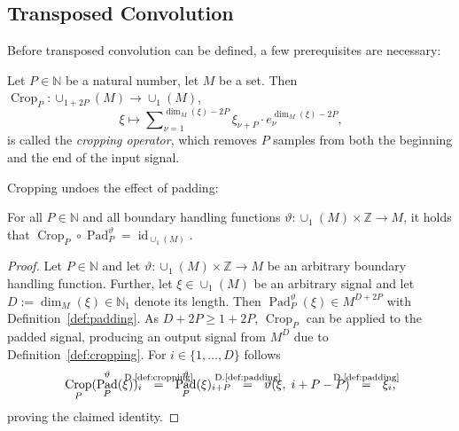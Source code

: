 \documentclass[journal]{IEEEtran}
\newcommand{\N}{\mathbb{N}}
\newcommand{\Z}{\mathbb{Z}}
\newcommand{\discint}[2]{\{#1,\dotsc,#2\}}
\newcommand{\inint}[2]{\in\discint{#1}{#2}}
\DeclareMathOperator{\id}{id}
\newcommand{\equsing}[1]{\overset{\mathclap{\text{#1}}}{=}}
\DeclareMathOperator{\Padding}{Pad}
\DeclareMathOperator{\Cropping}{Crop}
\begin{document}
\subsection{Transposed Convolution}
Before transposed convolution can be defined, a few prerequisites are necessary:
\begin{definition}
\label{def:cropping}
Let $P\in\N$ be a natural number, let $M$ be a set.
Then $\Cropping_P\colon\cup_{1 + 2P}(M) \to \cup_1(M)$,
\begin{displaymath}
  \xi\mapsto \sum\nolimits_{\nu = 1}^{\dim_M(\xi) - 2P} \xi_{\nu + P}\cdot e_{\nu}^{\dim_M(\xi) - 2P}\text{,}
\end{displaymath}
is called the \emph{cropping operator}, which removes $P$ samples from both the beginning and the end of the input signal.
\end{definition}

Cropping undoes the effect of padding:
\begin{remark}
For all $P\in\N$ and all boundary handling functions $\vartheta\colon\cup_1(M)\times\Z\to M$, it holds that $\Cropping_P \circ \Padding_P^\vartheta = \id_{\cup_1(M)}$.
\end{remark}\begin{proof}
Let $P\in\N$ and let $\vartheta\colon\cup_1(M)\times\Z\to M$ be an arbitrary boundary handling function.
Further, let $\xi\in\cup_1(M)$ be an arbitrary signal and let $D := \dim_M(\xi)\in\N_1$ denote its length.
Then $\Padding_P^\vartheta(\xi)\in M^{D + 2P}$ with Definition~\ref{def:padding}.
As $D + 2P \geq 1 + 2P$, $\Cropping_P$ can be applied to the padded signal, producing an output signal from $M^D$ due to Definition~\ref{def:cropping}.
For $i\inint{1}{D}$ follows
\begin{displaymath}
  \Cropping_P(\Padding_P^\vartheta(\xi))_i
  \ \ \equsing{D.\ref{def:cropping}}\ \ \Padding_P^\vartheta(\xi)_{i + P}
  \ \ \equsing{D.\ref{def:padding}}\ \ \vartheta(\xi,\;i + P - P)
  \ \ \equsing{D.\ref{def:padding}}\ \ \xi_i\text{,}
\end{displaymath}
proving the claimed identity.
\end{proof}
\end{document}
